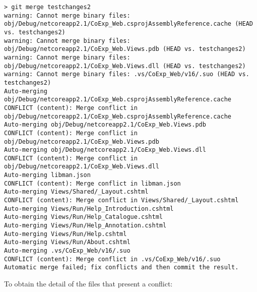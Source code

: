 \documentclass[]{book}
\begin{document}
\begin{verbatim}
> git merge testchanges2
warning: Cannot merge binary files: obj/Debug/netcoreapp2.1/CoExp_Web.csprojAssemblyReference.cache (HEAD vs. testchanges2)
warning: Cannot merge binary files: obj/Debug/netcoreapp2.1/CoExp_Web.Views.pdb (HEAD vs. testchanges2)
warning: Cannot merge binary files: obj/Debug/netcoreapp2.1/CoExp_Web.Views.dll (HEAD vs. testchanges2)
warning: Cannot merge binary files: .vs/CoExp_Web/v16/.suo (HEAD vs. testchanges2)
Auto-merging obj/Debug/netcoreapp2.1/CoExp_Web.csprojAssemblyReference.cache
CONFLICT (content): Merge conflict in obj/Debug/netcoreapp2.1/CoExp_Web.csprojAssemblyReference.cache
Auto-merging obj/Debug/netcoreapp2.1/CoExp_Web.Views.pdb
CONFLICT (content): Merge conflict in obj/Debug/netcoreapp2.1/CoExp_Web.Views.pdb
Auto-merging obj/Debug/netcoreapp2.1/CoExp_Web.Views.dll
CONFLICT (content): Merge conflict in obj/Debug/netcoreapp2.1/CoExp_Web.Views.dll
Auto-merging libman.json
CONFLICT (content): Merge conflict in libman.json
Auto-merging Views/Shared/_Layout.cshtml
CONFLICT (content): Merge conflict in Views/Shared/_Layout.cshtml
Auto-merging Views/Run/Help_Introduction.cshtml
Auto-merging Views/Run/Help_Catalogue.cshtml
Auto-merging Views/Run/Help_Annotation.cshtml
Auto-merging Views/Run/Help.cshtml
Auto-merging Views/Run/About.cshtml
Auto-merging .vs/CoExp_Web/v16/.suo
CONFLICT (content): Merge conflict in .vs/CoExp_Web/v16/.suo
Automatic merge failed; fix conflicts and then commit the result.
\end{verbatim}

To obtain the detail of the files that present a conflict:
\end{document}
